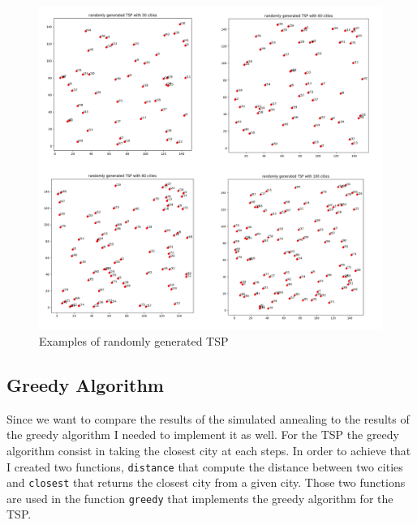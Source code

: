 \documentclass[14pt]
{article}
\begin{document}
\begin{figure}[h] %
\center
\includegraphics[scale=1]{img/randTSP.png}
\caption{Examples of randomly generated TSP}
\end{figure}

\subsection{Greedy Algorithm}
Since we want to compare the results of the simulated annealing to the results of the greedy algorithm I needed to implement it as well. For the TSP the greedy algorithm consist in taking the closest city at each steps. In order to achieve that I created two functions, \texttt{distance} that compute the distance between two cities and \texttt{closest} that returns the closest city from a given city. Those two functions are used in the function \texttt{greedy} that implements the greedy algorithm for the TSP.
\end{document}
